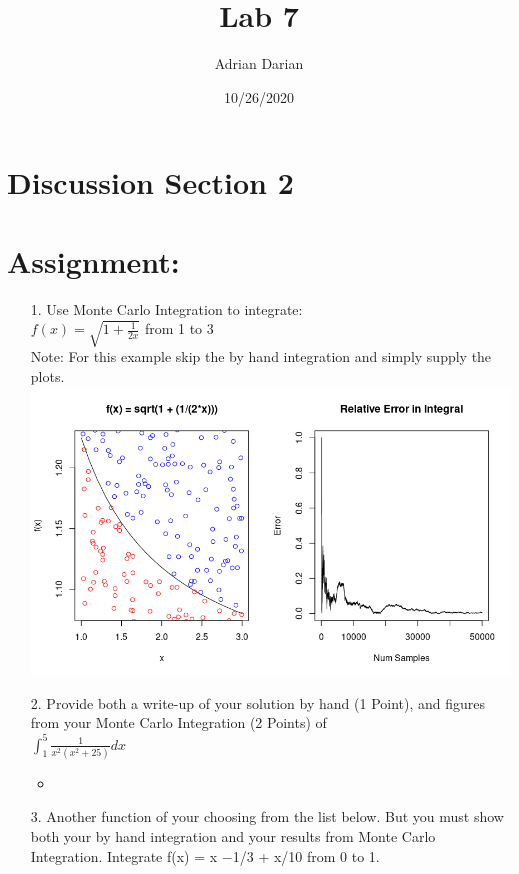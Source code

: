 \documentclass[a4paper]{article}
\title{Lab 7}
\author{Adrian Darian}
\date{10/26/2020}
\newcommand\tab[1][0.5cm]{\hspace*{#1}}
\begin{document}
  
\maketitle
  
\section*{Discussion Section 2}

\section*{Assignment:}
\begin{itemize}
    \item[1.] Use Monte Carlo Integration to integrate: \\
    \tab $f(x) = \sqrt{1 + \frac{1}{2x}}$ from 1 to 3 \\
    \tab Note: For this example skip the by hand integration and simply supply the plots. \\
    \includegraphics[scale=0.5]{Rplot.png}
    \item[2.] Provide both a write-up of your solution by hand (1 Point), and figures from
    your Monte Carlo Integration (2 Points) of \\
    \tab $\int _1^5\frac{1}{x^2\left(x^2+25\right)}dx$ \\
    \begin{itemize}
      \item 
    \end{itemize}
    \item[3.] Another function of your choosing from the list below. But you must show
    both your by hand integration and your results from Monte Carlo Integration.
    \tab Integrate f(x) = x −1/3 + x/10 from 0 to 1.
\end{itemize}

  
\end{document}
